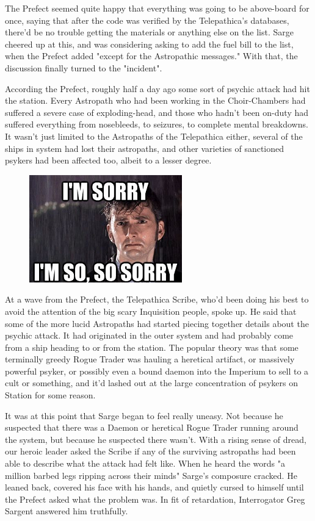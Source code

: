 The Prefect seemed quite happy that everything was going to be above-board for once, saying that after the code was verified by the Telepathica's databases, there'd be no trouble getting the materials or anything else on the list. 
Sarge cheered up at this, and was considering asking to add the fuel bill to the list, when the Prefect added "except for the Astropathic messages." With that, the discussion finally turned to the "incident".

According the Prefect, roughly half a day ago some sort of psychic attack had hit the station. 
Every Astropath who had been working in the Choir-Chambers had suffered a severe case of exploding-head, and those who hadn't been on-duty had suffered everything from nosebleeds, to seizures, to complete mental breakdowns. 
It wasn't just limited to the Astropaths of the Telepathica either, several of the ships in system had lost their astropaths, and other varieties of sanctioned psykers had been affected too, albeit to a lesser degree.

\begin{figure}
	\begin{center}
		\includegraphics[width=\figwidth]{pics/14/13.png}
	\end{center}
\end{figure}
At a wave from the Prefect, the Telepathica Scribe, who'd been doing his best to avoid the attention of the big scary Inquisition people, spoke up. 
He said that some of the more lucid Astropaths had started piecing together details about the psychic attack. 
It had originated in the outer system and had probably come from a ship heading to or from the station. 
The popular theory was that some terminally greedy Rogue Trader was hauling a heretical artifact, or massively powerful psyker, or possibly even a bound daemon into the Imperium to sell to a cult or something, and it'd lashed out at the large concentration of psykers on Station for some reason.

It was at this point that Sarge began to feel really uneasy. 
Not because he suspected that there was a Daemon or heretical Rogue Trader running around the system, but because he suspected there wasn't. 
With a rising sense of dread, our heroic leader asked the Scribe if any of the surviving astropaths had been able to describe what the attack had felt like. 
When he heard the words "a million barbed legs ripping across their minds" Sarge's composure cracked. 
He leaned back, covered his face with his hands, and quietly cursed to himself until the Prefect asked what the problem was. 
In fit of retardation, Interrogator Greg Sargent answered him truthfully.

